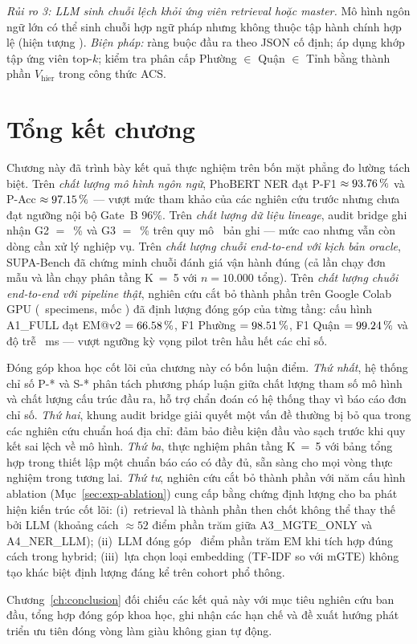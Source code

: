 \emph{Rủi ro 3: LLM sinh chuỗi lệch khỏi ứng viên retrieval hoặc master.} Mô hình ngôn ngữ lớn có thể sinh chuỗi hợp ngữ pháp nhưng không thuộc tập hành chính hợp lệ (hiện tượng ). \emph{Biện pháp:} ràng buộc đầu ra theo  JSON cố định; áp dụng  khớp tập ứng viên top-\(k\); kiểm tra phân cấp Phường \(\in\) Quận \(\in\) Tỉnh bằng thành phần \(V_{\text{hier}}\) trong công thức ACS.

\section{Tổng kết chương}
\label{sec:exp-summary}

Chương này đã trình bày kết quả thực nghiệm trên bốn mặt phẳng đo lường tách biệt. Trên \emph{chất lượng mô hình ngôn ngữ}, PhoBERT NER đạt P-F1 \(\approx 93.76\,\%\) và P-Acc \(\approx 97.15\,\%\) --- vượt mức tham khảo của các nghiên cứu trước nhưng chưa đạt ngưỡng nội bộ Gate~B \(96\%\). Trên \emph{chất lượng dữ liệu lineage}, audit bridge ghi nhận G2 \(=\) \VNAIGENAuditGTwoPct\,\% và G3 \(=\) \VNAIGENAuditGThreePct\,\% trên quy mô \VNAIGENAuditQueueTotal\, bản ghi --- mức cao nhưng vẫn còn \VNAIGENAuditGThreeFail\, dòng cần xử lý nghiệp vụ. Trên \emph{chất lượng chuỗi end-to-end với kịch bản oracle}, SUPA-Bench đã chứng minh chuỗi đánh giá vận hành đúng (cả lần chạy đơn \VNASUPANRequested\, mẫu và lần chạy phân tầng K~=~5 với \(n = 10.000\) tổng). Trên \emph{chất lượng chuỗi end-to-end với pipeline thật}, nghiên cứu cắt bỏ thành phần trên Google Colab GPU (\VNAIABLATIONTotalSpecimens\, specimens, mốc \VNAIABLATIONDate) đã định lượng đóng góp của từng tầng: cấu hình A1\_FULL đạt EM@v2 \(= 66.58\,\%\), F1 Phường \(= 98.51\,\%\), F1 Quận \(= 99.24\,\%\) và độ trễ \VNAIABLATIONAOneLatencyMs\, ms --- vượt ngưỡng kỳ vọng pilot trên hầu hết các chỉ số.

Đóng góp khoa học cốt lõi của chương này có bốn luận điểm. \emph{Thứ nhất}, hệ thống chỉ số P-* và S-* phân tách phương pháp luận giữa chất lượng tham số mô hình và chất lượng cấu trúc đầu ra, hỗ trợ chẩn đoán có hệ thống thay vì báo cáo đơn chỉ số. \emph{Thứ hai}, khung audit bridge giải quyết một vấn đề thường bị bỏ qua trong các nghiên cứu chuẩn hoá địa chỉ: đảm bảo điều kiện đầu vào sạch trước khi quy kết sai lệch về mô hình. \emph{Thứ ba}, thực nghiệm phân tầng K~=~5 với bảng tổng hợp  trong  thiết lập một chuẩn báo cáo có  đầy đủ, sẵn sàng cho mọi vòng thực nghiệm trong tương lai. \emph{Thứ tư}, nghiên cứu cắt bỏ thành phần với năm cấu hình ablation (Mục~\ref{sec:exp-ablation}) cung cấp bằng chứng định lượng cho ba phát hiện kiến trúc cốt lõi: (i)~retrieval là thành phần then chốt không thể thay thế bởi LLM (khoảng cách \(\approx 52\) điểm phần trăm giữa A3\_MGTE\_ONLY và A4\_NER\_LLM); (ii)~LLM đóng góp \VNAIABLATIONLLMContributionPp\, điểm phần trăm EM khi tích hợp đúng cách trong hybrid; (iii)~lựa chọn loại embedding (TF-IDF so với mGTE) không tạo khác biệt định lượng đáng kể trên cohort phổ thông.

Chương~\ref{ch:conclusion} đối chiếu các kết quả này với mục tiêu nghiên cứu ban đầu, tổng hợp đóng góp khoa học, ghi nhận các hạn chế và đề xuất hướng phát triển ưu tiên đóng vòng làm giàu không gian tự động.
